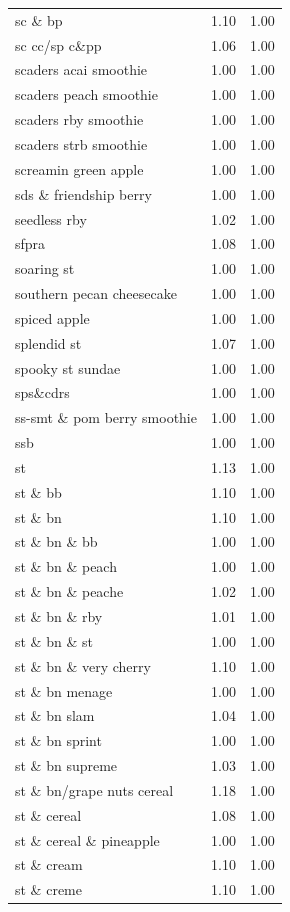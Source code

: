 \begin{table}
\begin{tabular}{lrr}
sc \& bp & 1.10 & 1.00 \\
sc cc/sp c\&pp & 1.06 & 1.00 \\
scaders acai smoothie & 1.00 & 1.00 \\
scaders peach smoothie & 1.00 & 1.00 \\
scaders rby smoothie & 1.00 & 1.00 \\
scaders strb smoothie & 1.00 & 1.00 \\
screamin green apple & 1.00 & 1.00 \\
sds \& friendship berry & 1.00 & 1.00 \\
seedless rby & 1.02 & 1.00 \\
sfpra & 1.08 & 1.00 \\
soaring st & 1.00 & 1.00 \\
southern pecan cheesecake & 1.00 & 1.00 \\
spiced apple & 1.00 & 1.00 \\
splendid st & 1.07 & 1.00 \\
spooky st sundae & 1.00 & 1.00 \\
sps\&cdrs & 1.00 & 1.00 \\
ss-smt \& pom berry smoothie & 1.00 & 1.00 \\
ssb & 1.00 & 1.00 \\
st & 1.13 & 1.00 \\
st \& bb & 1.10 & 1.00 \\
st \& bn & 1.10 & 1.00 \\
st \& bn \& bb & 1.00 & 1.00 \\
st \& bn \& peach & 1.00 & 1.00 \\
st \& bn \& peache & 1.02 & 1.00 \\
st \& bn \& rby & 1.01 & 1.00 \\
st \& bn \& st & 1.00 & 1.00 \\
st \& bn \& very cherry & 1.10 & 1.00 \\
st \& bn menage & 1.00 & 1.00 \\
st \& bn slam & 1.04 & 1.00 \\
st \& bn sprint & 1.00 & 1.00 \\
st \& bn supreme & 1.03 & 1.00 \\
st \& bn/grape nuts cereal & 1.18 & 1.00 \\
st \& cereal & 1.08 & 1.00 \\
st \& cereal \& pineapple & 1.00 & 1.00 \\
st \& cream & 1.10 & 1.00 \\
st \& creme & 1.10 & 1.00 \\

\end{tabular}
\end{table}

